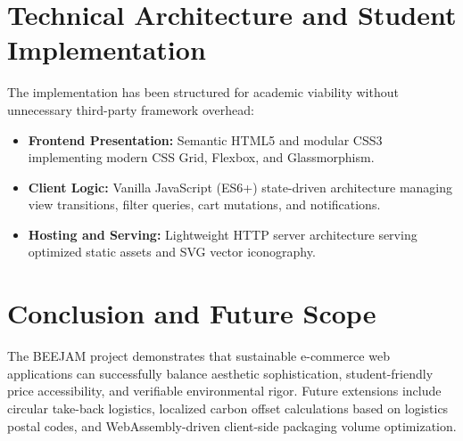 \documentclass[11pt,a4paper]{article}
\begin{document}
\section{Technical Architecture and Student Implementation}
The implementation has been structured for academic viability without unnecessary third-party framework overhead:
\begin{itemize}
    \item \textbf{Frontend Presentation:} Semantic HTML5 and modular CSS3 implementing modern CSS Grid, Flexbox, and Glassmorphism.
    \item \textbf{Client Logic:} Vanilla JavaScript (ES6+) state-driven architecture managing view transitions, filter queries, cart mutations, and notifications.
    \item \textbf{Hosting and Serving:} Lightweight HTTP server architecture serving optimized static assets and SVG vector iconography.
\end{itemize}

\section{Conclusion and Future Scope}
The BEEJAM project demonstrates that sustainable e-commerce web applications can successfully balance aesthetic sophistication, student-friendly price accessibility, and verifiable environmental rigor. Future extensions include circular take-back logistics, localized carbon offset calculations based on logistics postal codes, and WebAssembly-driven client-side packaging volume optimization.
\end{document}

